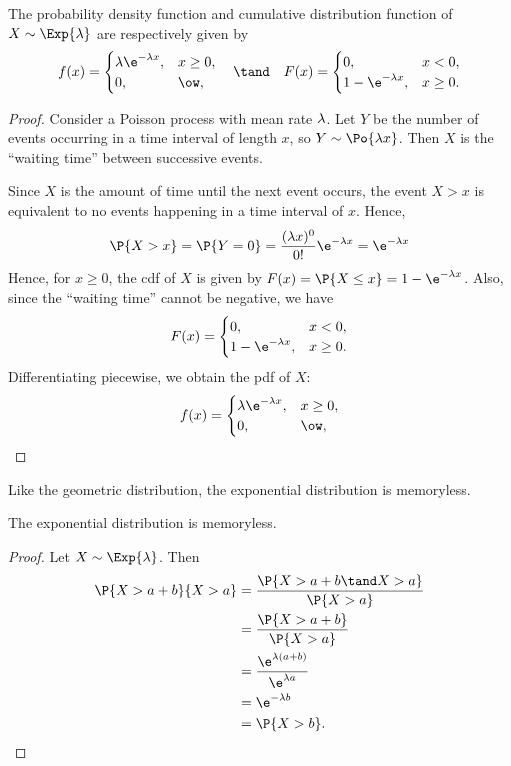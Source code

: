 \begin{proposition}
    The probability density function and cumulative distribution function of $X \sim \Exp{\l}$ are respectively given by \[f(x) = \begin{cases}
        \l \e^{-\l x}, & x \geq 0,\\
        0, & \ow,
    \end{cases} \quad \tand \quad F(x) = \begin{cases}
        0, & x < 0,\\
        1 - \e^{-\l x}, & x \geq 0.
    \end{cases}\]
\end{proposition}
\begin{proof}
    Consider a Poisson process with mean rate $\lambda$. Let $Y$ be the number of events occurring in a time interval of length $x$, so $Y \sim \Po{\l x}$. Then $X$ is the ``waiting time'' between successive events.

    Since $X$ is the amount of time until the next event occurs, the event $X > x$ is equivalent to no events happening in a time interval of $x$. Hence, \[\P{X > x} = \P{Y = 0} = \frac{(\l x)^0}{0!} \e^{-\l x} = \e^{-\l x}\] Hence, for $x \geq 0$, the cdf of $X$ is given by $F(x) = \P{X \leq x} = 1 - \e^{-\l x}$. Also, since the ``waiting time'' cannot be negative, we have \[F(x) = \begin{cases}
        0, & x < 0,\\
        1 - \e^{-\l x}, & x \geq 0.
    \end{cases}\] Differentiating piecewise, we obtain the pdf of $X$: \[f(x) = \begin{cases}
        \l \e^{-\l x}, & x \geq 0,\\
        0, & \ow,
    \end{cases}\]
\end{proof}

Like the geometric distribution, the exponential distribution is memoryless.

\begin{proposition}
    The exponential distribution is memoryless.
\end{proposition}
\begin{proof}
    Let $X \sim \Exp{\l}$. Then
    \begin{align*}
        \P{X > a + b}{X > a} &= \frac{\P{X > a + b \tand X > a}}{\P{X > a}}\\
        &= \frac{\P{X > a + b}}{\P{X > a}} \\
        &= \frac{\e^{\l (a + b)}}{\e^{\l a}}\\
        &= \e^{-\l b}\\
        &= \P{X > b}.
    \end{align*}
\end{proof}

